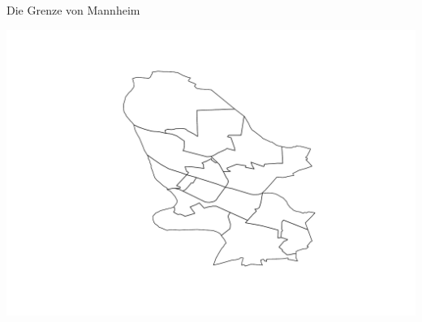 \documentclass[ignorenonframetext,]{beamer}
\newenvironment{Shaded}{\begin{snugshade}}{\end{snugshade}}
\newcommand{\KeywordTok}[1]{\textcolor[rgb]{0.26,0.66,0.93}{\textbf{#1}}}
\newcommand{\StringTok}[1]{\textcolor[rgb]{0.02,0.61,0.04}{#1}}
\newcommand{\OperatorTok}[1]{\textcolor[rgb]{0.74,0.68,0.62}{#1}}
\newcommand{\NormalTok}[1]{\textcolor[rgb]{0.74,0.68,0.62}{#1}}
\begin{document}
\begin{frame}[fragile]{Die Grenze von Mannheim}

\begin{Shaded}
\end{Shaded}

\includegraphics{Geomedizin_files/figure-beamer/unnamed-chunk-139-1.pdf}

\end{frame}
\end{document}
